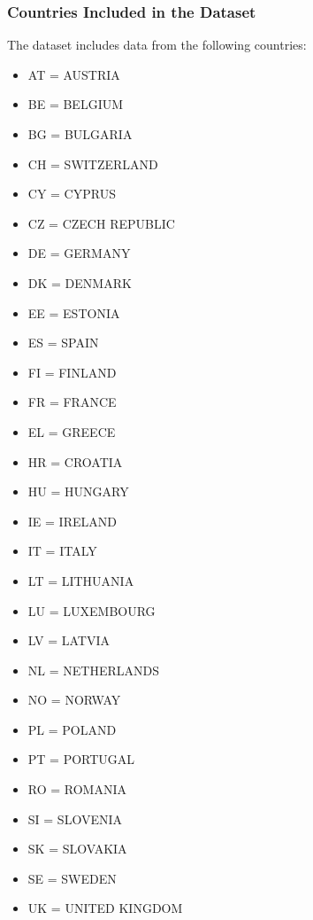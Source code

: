 \documentclass[12pt]{article}
\begin{document}
\subsubsection{Countries Included in the Dataset}
The dataset includes data from the following countries:
\begin{multicols}{2}
\begin{itemize}
    \item AT = AUSTRIA
    \item BE = BELGIUM
    \item BG = BULGARIA
    \item CH = SWITZERLAND
    \item CY = CYPRUS
    \item CZ = CZECH REPUBLIC
    \item DE = GERMANY
    \item DK = DENMARK
    \item EE = ESTONIA
    \item ES = SPAIN
    \item FI = FINLAND
    \item FR = FRANCE
    \item EL = GREECE
    \item HR = CROATIA
    \item HU = HUNGARY
    \item IE = IRELAND
    \item IT = ITALY
    \item LT = LITHUANIA
    \item LU = LUXEMBOURG
    \item LV = LATVIA
    \item NL = NETHERLANDS
    \item NO = NORWAY
    \item PL = POLAND
    \item PT = PORTUGAL
    \item RO = ROMANIA
    \item SI = SLOVENIA
    \item SK = SLOVAKIA
    \item SE = SWEDEN
    \item UK = UNITED KINGDOM
  \end{itemize}
\end{multicols}
\end{document}
